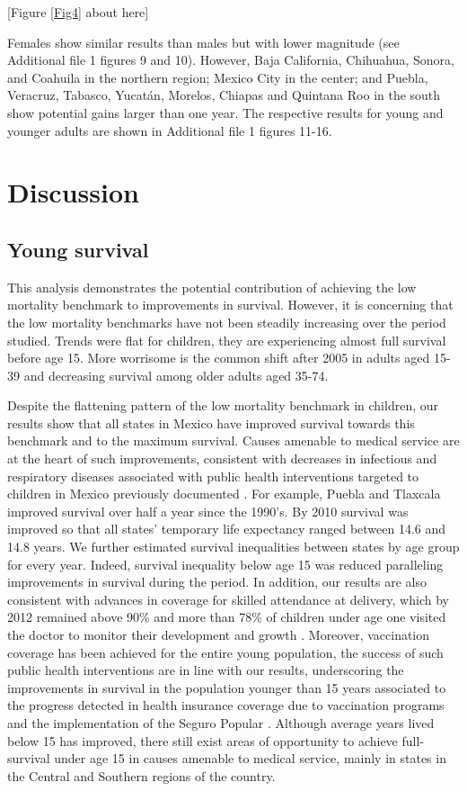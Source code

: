 \documentclass{bmcart}
\begin{document}
\begin{center}
[Figure \ref{Fig4} about here]
\end{center}


Females show similar results than males but with lower magnitude (see Additional file 1 figures 9 and 10). However, Baja California, Chihuahua, Sonora, and Coahuila in the northern region; Mexico City in the center; and  Puebla, Veracruz, Tabasco, Yucat\'an, Morelos, Chiapas and Quintana Roo in the south show potential gains larger than one year. The respective results for young and younger adults are shown in Additional file 1 figures 11-16.


\section*{Discussion}
\subsection*{Young survival}

This analysis demonstrates the potential contribution of achieving the low mortality benchmark to improvements in survival. However, it is concerning that the low mortality benchmarks have not been steadily increasing over the period studied. Trends were flat for children, they are experiencing almost full survival before age 15. More worrisome is the common shift after 2005 in adults aged 15-39 and decreasing survival among older adults aged 35-74.

Despite the flattening pattern of the low mortality benchmark in children, our results show that all states in Mexico have improved survival towards this benchmark and to the maximum survival. Causes amenable to medical service are at the heart of such improvements, consistent with decreases in infectious and respiratory diseases associated with public health interventions targeted to children in Mexico previously documented \cite{sepulveda2006}. For example, Puebla and Tlaxcala improved survival over half a year since the 1990's. By 2010 survival was improved so that all states' temporary life expectancy ranged between 14.6 and 14.8 years. We further estimated survival inequalities between states by age group for every year.  Indeed, survival inequality below age 15 was reduced paralleling improvements in survival during the period. In addition, our results are also consistent with advances in coverage for skilled attendance at delivery, which by 2012 remained above 90\% and more than 78\% of children under age one visited the doctor to monitor their development and growth  \cite{urquieta2015evolution}. Moreover, vaccination coverage has been achieved for the entire young population, the success of such public health interventions are in line with our results, underscoring the improvements in survival in the population younger than 15 years associated to the progress detected in health insurance coverage due to vaccination programs and the implementation of the Seguro Popular \cite{urquieta2015evolution}. Although average years lived below 15 has improved, there still exist areas of opportunity to achieve full-survival under age 15 in causes amenable to medical service, mainly in states in the Central and Southern regions of the country. 
\end{document}
